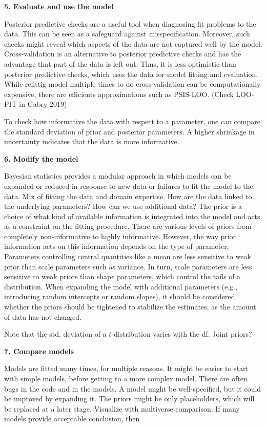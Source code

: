 \textbf{5. Evaluate and use the model}

Posterior predictive checks are a useful tool when diagnosing fit problems to the data.
This can be seen as a safeguard against misspecification.
Moreover, such checks might reveal which aspects of the data are not captured well by the model.
Cross-validation is an alternative to posterior predictive checks and has the advantage that part of the data is left out.
Thus, it is less optimistic than posterior predictive checks, which uses the data for model fitting and evaluation.
While refittig model multiple times to do cross-validation can be computationally expensive, there are efficients approximations such as PSIS-LOO.
(Check LOO-PIT in Gabry 2019)

To check how informative the data with respect to a parameter, one can compare the standard deviation of prior and posterior parameters. A higher shrinkage in uncertainty indicates that the data is more informative.

\textbf{6. Modify the model}

Bayesian statistics provides a modular approach in which models can be expanded or reduced in response to new data or failures to fit the model to the data.
Mix of fitting the data and domain expertise.
How are the data linked to the underlying parameters?
How can we use additional data?
The prior is a choice of what kind of available information is integrated into the model and acts as a constraint on the fitting procedure.
There are various levels of priors from completely non-informative to highly informative.
However, the way prior information acts on this information depends on the type of parameter.
Parameters controlling central quantities like a mean are less sensitive to weak prior than scale parameters such as variance.
In turn, scale parameters are less sensitive to weak priors than shape parameters, which control the tails of a distribution.
When expanding the model with additional parameters (e.g., introducing random intercepts or random slopes), it should be considered whether the priors should be tightened to stabilize the estimates, as the amount of data has not changed.

Note that the std. deviation of a $t$-distribution varies with the df.
Joint priors?


\textbf{7. Compare models}

Models are fitted many times, for multiple reasons.
It might be easier to start with simple models, before getting to a more complex model. There are often bugs in the code and in the models.
A model might be well-specified, but it could be improved by expanding it.
The priors might be only placeholders, which will be replaced at a later stage.
Visualize with multiverse comparison.
If many models provide acceptable conclusion, then

